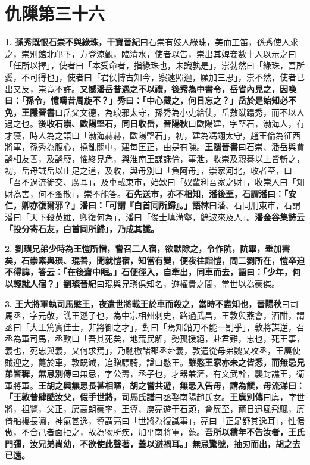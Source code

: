 \chapter{仇隟第三十六}

\textbf{1.} \textbf{孫秀既恨石崇不與綠珠，}{\footnotesize \textbf{干寶晉紀}曰石崇有妓人綠珠，美而工笛，孫秀使人求之，崇別館北邙下，方登涼觀，臨清水，使者以告，崇出其婢妾數十人以示之曰「任所以擇」，使者曰「本受命者，指綠珠也，未識孰是」，崇勃然曰「綠珠，吾所愛，不可得也」，使者曰「君侯博古知今，察遠照邇，願加三思」，崇不然，使者已出又反，崇竟不許。}\textbf{又憾潘岳昔遇之不以禮，後秀為中書令，岳省內見之，因喚曰：「孫令，憶疇昔周旋不？」秀曰：「中心藏之，何日忘之？」岳於是始知必不免，}{\footnotesize \textbf{王隱晉書}曰岳父文德，為琅邪太守，孫秀為小吏給使，岳數蹴蹋秀，而不以人遇之也。}\textbf{後收石崇、歐陽堅石，同日收岳，}{\footnotesize \textbf{晉陽秋}曰歐陽建，字堅石，渤海人，有才藻，時人為之語曰「渤海赫赫，歐陽堅石」，初，建為馮翊太守，趙王倫為征西將軍，孫秀為腹心，撓亂關中，建每匡正，由是有隟。\textbf{王隱晉書}曰石崇、潘岳與賈謐相友善，及謐廢，懼終見危，與淮南王謀誅倫，事泄，收崇及親朞以上皆斬之，初，岳母誡岳以止足之道，及收，與母別曰「負阿母」，崇家河北，收者至，曰「吾不過流徙交、廣耳」，及車載東市，始歎曰「奴輩利吾家之財」，收崇人曰「知財為害，何不蚤散」，崇不能答。}\textbf{石先送市，亦不相知，潘後至，石謂潘曰：「安仁，卿亦復爾邪？」潘曰：「可謂『白首同所歸』。」}{\footnotesize \textbf{語林}曰潘、石同刑東市，石謂潘曰「天下殺英雄，卿復何為」，潘曰「俊士填溝壑，餘波來及人」。}\textbf{潘金谷集詩云「投分寄石友，白首同所歸」，乃成其讖。}

\textbf{2.} \textbf{劉璵兄弟少時為王愷所憎，嘗召二人宿，欲默除之，令作阬，阬畢，垂加害矣，石崇素與璵、琨善，聞就愷宿，知當有變，便夜往詣愷，問二劉所在，愷卒迫不得諱，答云：「在後齋中眠。」石便徑入，自牽出，同車而去，語曰：「少年，何以輕就人宿？」}{\footnotesize \textbf{劉璨晉紀}曰琨與兄璵俱知名，遊權貴之間，當世以為豪傑。}

\textbf{3.} \textbf{王大將軍執司馬愍王，夜遣世將載王於車而殺之，當時不盡知也，}{\footnotesize \textbf{晉陽秋}曰司馬丞，字元敬，譙王遜子也，為中宗相州刺史，路過武昌，王敦與燕會，酒酣，謂丞曰「大王篤實佳士，非將御之才」，對曰「焉知鉛刀不能一割乎」，敦將謀逆，召丞為軍司馬，丞歎曰「吾其死矣，地荒民解，勢孤援絕，赴君難，忠也，死王事，義也，死忠與義，又何求焉」，乃馳檄諸郡丞赴義，敦遣從母弟魏乂攻丞，王廙使賊迎之，薨於車，敦既滅，追贈驃騎，諡曰愍王。}\textbf{雖愍王家亦未之皆悉，而無忌兄弟皆穉，}{\footnotesize \textbf{無忌別傳}曰無忌，字公壽，丞子也，才器兼濟，有文武幹，襲封譙王，衛軍將軍。}\textbf{王胡之與無忌長甚相暱，胡之嘗共遊，無忌入告母，請為饌，母流涕曰：「王敦昔肆酷汝父，假手世將，}{\footnotesize \textbf{司馬氏譜}曰丞娶南陽趙氏女。\textbf{王廙別傳}曰廙，字世將，祖覽，父正，廙高朗豪率，王導、庾亮遊于石頭，會廙至，爾日迅風飛颿，廙倚船樓長嘯，神氣甚逸，導謂亮曰「世將為復識事」，亮曰「正足舒其逸耳」，性倨傲，不合己者面拒之，故為物所疾，加平南將軍，薨。}\textbf{吾所以積年不告汝者，王氏門彊，汝兄弟尚幼，不欲使此聲著，蓋以避禍耳。」無忌驚號，抽刃而出，胡之去已遠。}

